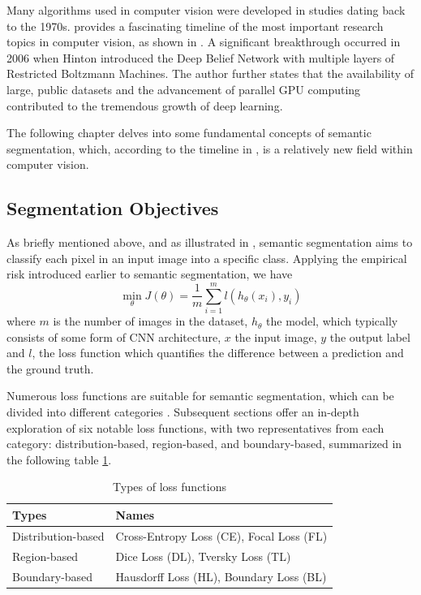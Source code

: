 Many algorithms used in computer vision were developed in studies dating back to the 1970s. \cite{szeliski2022computer} provides a fascinating timeline of the most important research topics in computer vision, as shown in . A significant breakthrough occurred in 2006 when Hinton introduced the Deep Belief Network with multiple layers of Restricted Boltzmann Machines. The author further states that the availability of large, public datasets and the advancement of parallel GPU computing contributed to the tremendous growth of deep learning.

The following chapter delves into some fundamental concepts of semantic segmentation, which, according to the timeline in , is a relatively new field within computer vision.

\subsection{Segmentation Objectives}
\label{subsec:segmentation_objectives}
As briefly mentioned above, and as illustrated in , semantic segmentation aims to classify each pixel in an input image into a specific class. Applying the empirical risk introduced earlier to semantic segmentation, we have
\begin{equation}
    \mathop{\min}_{\theta} J(\theta) = \frac{1}{m}\sum_{i=1}^m l(h_{\theta}(x_i),y_i)
\end{equation}
where $m$ is the number of images in the dataset, $h_{\theta}$ the model, which typically consists of some form of \ac{CNN} architecture, $x$ the input image, $y$ the output label and $l$, the loss function which quantifies the difference between a prediction and the ground truth.

Numerous loss functions are suitable for semantic segmentation, which can be divided into different categories \cite{https://doi.org/10.48550/arxiv.2005.13449}. Subsequent sections offer an in-depth exploration of six notable loss functions, with two representatives from each category: distribution-based, region-based, and boundary-based, summarized in the following table \ref{tab:type_of_loss_functions_all}.
\begin{table}[H]
    \centering
    \begin{tabular}{|l|l|}
        \hline
        \rowcolor[HTML]{6638B6}
        {\color[HTML]{FFFFFF} \textbf{Types}} & {\color[HTML]{FFFFFF} \textbf{Names}}    \\ \hline
        Distribution-based                    & Cross-Entropy Loss (CE), Focal Loss (FL) \\ \hline
        Region-based                          & Dice Loss (DL), Tversky Loss (TL)        \\ \hline
        Boundary-based                        & Hausdorff Loss (HL), Boundary Loss (BL)  \\ \hline
    \end{tabular}
    \caption[Types of loss functions]{Types of loss functions}
    \label{tab:type_of_loss_functions_all}
\end{table}

